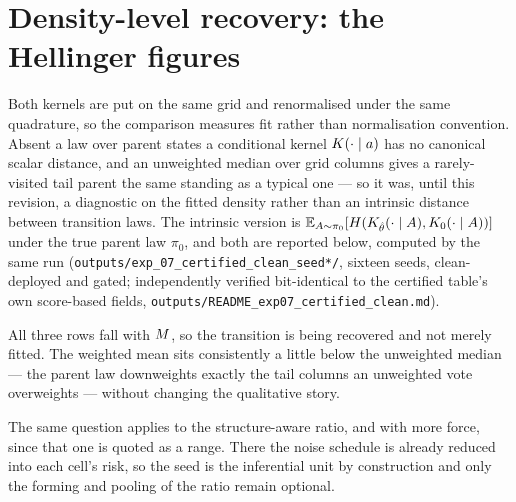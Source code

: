 \section{Density-level recovery: the Hellinger figures}
\label{app:hellinger}

Both kernels are put on the same grid and renormalised under the same quadrature, so the
comparison measures fit rather than normalisation convention. Absent a law over parent states a
conditional kernel $K(\cdot\mid a)$ has no canonical scalar distance, and an unweighted
median over grid columns gives a rarely-visited tail parent the same standing as a typical one ---
so it was, until this revision, a diagnostic on the fitted density rather than an intrinsic
distance between transition laws. The intrinsic version is $\mathbb{E}_{A\sim\pi_0}[H(K_{\hat{\theta}}
(\cdot\mid A), K_0(\cdot\mid A))]$ under the true parent law $\pi_0$, and both are reported
below, computed by the same run (\texttt{outputs/exp\_07\_certified\_clean\_seed*/}, sixteen
seeds, clean-deployed and gated; independently verified bit-identical to the certified table's
own score-based fields, \texttt{outputs/README\_exp07\_certified\_clean.md}).



\noindent All three rows fall with $M$, so the transition is being recovered and not merely
fitted. The weighted mean sits consistently a little below the unweighted median --- the parent
law downweights exactly the tail columns an unweighted vote overweights --- without changing the
qualitative story.



The same question applies to the structure-aware ratio, and with more force, since that one is
quoted as a range. There the noise schedule is already reduced into each cell's risk, so the seed
is the inferential unit by construction and only the forming and pooling of the ratio remain
optional.


